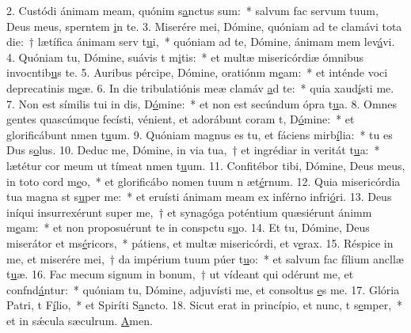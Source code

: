 2. Custódi ánimam meam, quónim s\uline{a}nctus sum:~* salvum fac servum tuum, Deus meus, sperntem \uline{i}n te.
3. Miserére mei, Dómine, quóniam ad te clamávi tota die:~† lætífica ánimam serv t\uline{u}i,~* quóniam ad te, Dómine, ánimam mem lev\uline{á}vi.
4. Quóniam tu, Dómine, suávis t m\uline{i}tis:~* et multæ misericórdiæ ómnibus invocntib\uline{u}s te.
5. Auribus pércipe, Dómine, oratiónm m\uline{e}am:~* et inténde voci deprecatinis m\uline{e}æ.
6. In die tribulatiónis meæ clamáv \uline{a}d te:~* quia xaud\uline{í}sti me.
7. Non est símilis tui in dis, D\uline{ó}mine:~* et non est secúndum ópra t\uline{u}a.
8. Omnes gentes quascúmque fecísti, vénient, et adorábunt coram t, D\uline{ó}mine:~* et glorificábunt nmen t\uline{u}um.
9. Quóniam magnus es tu, et fáciens mirb\uline{í}lia:~* tu es Dus s\uline{o}lus.
10. Deduc me, Dómine, in via tua,~† et ingrédiar in veritát t\uline{u}a:~* lætétur cor meum ut tímeat nmen t\uline{u}um.
11. Confitébor tibi, Dómine, Deus meus, in toto cord m\uline{e}o,~* et glorificábo nomen tuum n æt\uline{é}rnum.
12. Quia misericórdia tua magna st s\uline{u}per me:~* et eruísti ánimam meam ex inférno infri\uline{ó}ri.
13. Deus iníqui insurrexérunt super me,~† et synagóga poténtium quæsiérunt ánimm m\uline{e}am:~* et non proposuérunt te in conspctu s\uline{u}o.
14. Et tu, Dómine, Deus miserátor et ms\uline{é}ricors,~* pátiens, et multæ misericórdi, et v\uline{e}rax.
15. Réspice in me, et miserére mei,~† da impérium tuum púer t\uline{u}o:~* et salvum fac fílium ancllæ t\uline{u}æ.
16. Fac mecum signum in bonum,~† ut vídeant qui odérunt me, et confnd\uline{á}ntur:~* quóniam tu, Dómine, adjuvísti me, et consoltus \uline{e}s me.
17. Glória Patri, t F\uline{í}lio,~* et Spiríti S\uline{a}ncto.
18. Sicut erat in princípio, et nunc, t s\uline{e}mper,~* et in sǽcula sæculrum. \uline{A}men.
